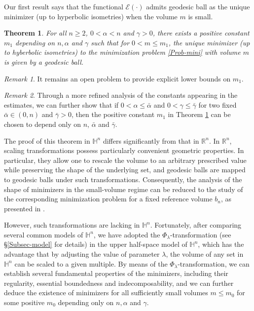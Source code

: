 \documentclass[11pt,reqno]{amsart}
\newtheorem{thm}{Theorem}[section]
\theoremstyle{definition}
\theoremstyle{remark}
\newtheorem{rem}{Remark}
\numberwithin{equation}{section}
\renewcommand{\(}{\left(}
\renewcommand{\)}{\right)}
\renewcommand{\-}{\overline}
\begin{document}
Our first result says that the functional $\mathcal{E}(\cdot)$ admits geodesic ball as the unique minimizer (up to hyperbolic isometries) when the volume $m$ is small.
\begin{thm}\label{Thm-Existence}
	For all $n\geq 2$, $0<\alpha<n$ and $\gamma>0$, there exists a positive constant $m_1$ depending on $n,\alpha$ and $\gamma$ such that for $0<m\leq m_1$, the unique minimizer (up to hyberbolic isometries) to the minimization problem \eqref{Prob-mini} with volume $m$ is given by a geodesic ball. 
\end{thm}
\begin{rem}
	It remains an open problem to provide  explicit lower bounds on $m_1$.
\end{rem}
\begin{rem}
	Through a more refined analysis of the constants appearing in the estimates, we can further show that if $0<\alpha\leq\bar{\alpha}$ and $0<\gamma\leq\bar{\gamma}$ for two fixed $\bar{\alpha}\in(0,n)$ and $\bar{\gamma}>0$, then the positive constant $m_1$ in Theorem \ref{Thm-Existence} can be chosen to depend only on $n$, $\bar{\alpha}$ and $\bar{\gamma}$.
\end{rem}
The proof of this theorem in $\mathbb{H}^n$ differs significantly from that in $\mathbb{R}^n$. In $\mathbb{R}^n$, scaling transformations possess particularly convenient geometric properties. In particular, they allow one to rescale the volume to an arbitrary prescribed value while preserving the shape of the underlying set, and geodesic balls are mapped to geodesic balls under such transformations. Consequently, the analysis of the shape of minimizers in the small-volume regime can be reduced to the study of the corresponding minimization problem for a fixed reference volume $b_n$, as presented in \cites{Bonacini-Cristoferi14,Knupfer-Muratov13,Knupfer-Muratov14,Figalli15}. 

However, such transformations are lacking in $\mathbb{H}^n$. Fortunately, after comparing several common models of $\mathbb{H}^n$, we have adopted the $\Phi_{\lambda}$-transformation (see \S\ref{Subsec-model} for details) in the upper half-space model of $\mathbb{H}^n$, which has the advantage that by adjusting the value of parameter $\lambda$, the volume of any set in $\mathbb{H}^n$ can be scaled to a given multiple. By means of the $\Phi_{\lambda}$-transformation, we can establish several fundamental properties of the minimizers, including their regularity, essential boundedness and indecomposability, and we can further deduce the existence of minimizers for all sufficiently small volumes $m\leq m_0$ for some positive $m_0$ depending only on $n,\alpha$ and $\gamma$. 
\end{document}
